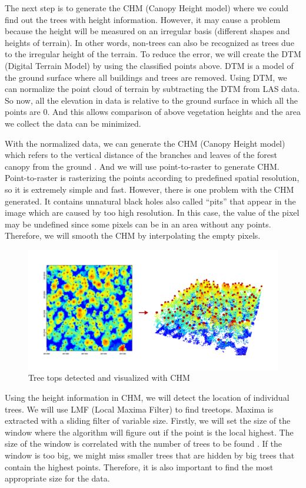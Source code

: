 \documentclass[a4paper, 12pt]{article}
\begin{document}
The next step is to generate the CHM (Canopy Height model) where we could find out the trees with height information. However, it may cause a problem because the height will be measured on an irregular basis (different shapes and heights of terrain). In other words, non-trees can also be recognized as trees due to the irregular height of the terrain. To reduce the error, we will create the DTM (Digital Terrain Model) by using the classified points above. DTM is a model of the ground surface where all buildings and trees are removed. Using DTM, we can normalize the point cloud of terrain by subtracting the DTM from LAS data. So now, all the elevation in data is relative to the ground surface in which all the points are 0. And this allows comparison of above vegetation heights and the area we collect the data can be minimized. 

With the normalized data, we can generate the CHM (Canopy Height model) which refers to the vertical distance of the branches and leaves of the forest canopy from the ground \cite{7}. And we will use point-to-raster to generate CHM. Point-to-raster is rasterizing the points according to predefined spatial resolution, so it is extremely simple and fast. However, there is one problem with the CHM generated. It contains unnatural black holes also called “pits” that appear in the image which are caused by too high resolution. In this case, the value of the pixel may be undefined since some pixels can be in an area without any points. Therefore, we will smooth the CHM by interpolating the empty pixels.

\begin{figure}[H]
    \centering
    \includegraphics[scale=0.2]{Images/treetop.png}
    \caption{Tree tops detected and visualized with CHM}
\end{figure}

Using the height information in CHM, we will detect the location of individual trees. We will use LMF (Local Maxima Filter) to find treetops. Maxima is extracted with a sliding filter of variable size. Firstly, we will set the size of the window where the algorithm will figure out if the point is the local highest. The size of the window is correlated with the number of trees to be found \cite{8}. If the window is too big, we might miss smaller trees that are hidden by big trees that contain the highest points. Therefore, it is also important to find the most appropriate size for the data. 
\end{document}
